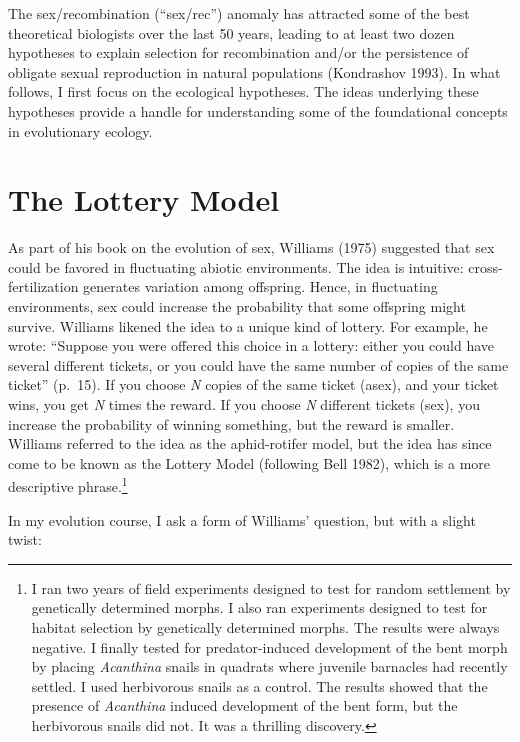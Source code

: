 \documentclass[
  letterpaper,
]{book}
\begin{document}
The sex/recombination (``sex/rec'') anomaly has attracted some of the
best theoretical biologists over the last 50 years, leading to at least
two dozen hypotheses to explain selection for recombination and/or the
persistence of obligate sexual reproduction in natural populations
(Kondrashov 1993). In what follows, I first focus on the ecological
hypotheses. The ideas underlying these hypotheses provide a handle for
understanding some of the foundational concepts in evolutionary ecology.

\hypertarget{the-lottery-model}{%
\section{The Lottery Model}\label{the-lottery-model}}

As part of his book on the evolution of sex, Williams (1975) suggested
that sex could be favored in fluctuating abiotic environments. The idea
is intuitive: cross-fertilization generates variation among offspring.
Hence, in fluctuating environments, sex could increase the probability
that some offspring might survive. Williams likened the idea to a unique
kind of lottery. For example, he wrote: ``Suppose you were offered this
choice in a lottery: either you could have several different tickets, or
you could have the same number of copies of the same ticket'' (p.~15).
If you choose \emph{N} copies of the same ticket (asex), and your ticket
wins, you get \emph{N} times the reward. If you choose \emph{N}
different tickets (sex), you increase the probability of winning
something, but the reward is smaller. Williams referred to the idea as
the aphid-rotifer model, but the idea has since come to be known as the
Lottery Model (following Bell 1982), which is a more descriptive
phrase.\footnote{I ran two years of field experiments designed to test
  for random settlement by genetically determined morphs. I also ran
  experiments designed to test for habitat selection by genetically
  determined morphs. The results were always negative. I finally tested
  for predator-induced development of the bent morph by placing
  \emph{Acanthina} snails in quadrats where juvenile barnacles had
  recently settled. I used herbivorous snails as a control. The results
  showed that the presence of \emph{Acanthina} induced development of
  the bent form, but the herbivorous snails did not. It was a thrilling
  discovery.}

In my evolution course, I ask a form of Williams' question, but with a
slight twist:
\end{document}
